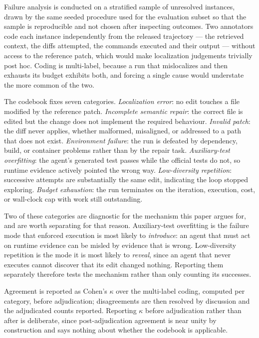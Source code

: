 \documentclass[journal]{IEEEtran}
\begin{document}
Failure analysis is conducted on a stratified sample of unresolved instances, drawn by the same seeded procedure used for the evaluation subset so that the sample is reproducible and not chosen after inspecting outcomes. Two annotators code each instance independently from the released trajectory --- the retrieved context, the diffs attempted, the commands executed and their output --- without access to the reference patch, which would make localization judgements trivially post hoc. Coding is multi-label, because a run that mislocalizes and then exhausts its budget exhibits both, and forcing a single cause would understate the more common of the two.

The codebook fixes seven categories. \emph{Localization error}: no edit touches a file modified by the reference patch. \emph{Incomplete semantic repair}: the correct file is edited but the change does not implement the required behaviour. \emph{Invalid patch}: the diff never applies, whether malformed, misaligned, or addressed to a path that does not exist. \emph{Environment failure}: the run is defeated by dependency, build, or container problems rather than by the repair task. \emph{Auxiliary-test overfitting}: the agent's generated test passes while the official tests do not, so runtime evidence actively pointed the wrong way. \emph{Low-diversity repetition}: successive attempts are substantially the same edit, indicating the loop stopped exploring. \emph{Budget exhaustion}: the run terminates on the iteration, execution, cost, or wall-clock cap with work still outstanding.

Two of these categories are diagnostic for the mechanism this paper argues for, and are worth separating for that reason. Auxiliary-test overfitting is the failure mode that enforced execution is most likely to \emph{introduce}: an agent that must act on runtime evidence can be misled by evidence that is wrong. Low-diversity repetition is the mode it is most likely to \emph{reveal}, since an agent that never executes cannot discover that its edit changed nothing. Reporting them separately therefore tests the mechanism rather than only counting its successes.

Agreement is reported as Cohen's $\kappa$ over the multi-label coding, computed per category, before adjudication; disagreements are then resolved by discussion and the adjudicated counts reported. Reporting $\kappa$ before adjudication rather than after is deliberate, since post-adjudication agreement is near unity by construction and says nothing about whether the codebook is applicable.
\end{document}
